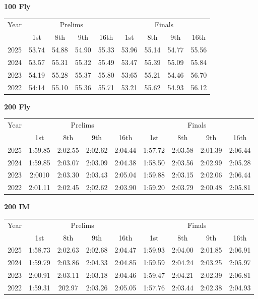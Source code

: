 \textbf{100 Fly}

\begin{flushleft}
\begin{tabular}{|c|c|c|c|c|c|c|c|c|}
\hline
Year & \multicolumn{4}{c|}{Prelims} & \multicolumn{4}{c|}{Finals} \\
\cline{2-9}
& 1st & 8th & 9th & 16th & 1st & 8th & 9th & 16th \\
\hline
2025 & 53.74 & 54.88 & 54.90 & 55.33 & 53.96 & 55.14 & 54.77 & 55.56 \\
2024 & 53.57 & 55.31 & 55.32 & 55.49 & 53.47 & 55.39 & 55.09 & 55.84 \\
2023 & 54.19 & 55.28 & 55.37 & 55.80 & 53:65 & 55.21 & 54.46 & 56.70 \\
2022 & 54:14 & 55.10 & 55.36 & 55.71 & 53.21 & 55.62 & 54.93 & 56.12 \\
\hline
\end{tabular}
\end{flushleft}

\textbf{200 Fly}

\begin{flushleft}
\begin{tabular}{|c|c|c|c|c|c|c|c|c|}
\hline
Year & \multicolumn{4}{c|}{Prelims} & \multicolumn{4}{c|}{Finals} \\
\cline{2-9}
& 1st & 8th & 9th & 16th & 1st & 8th & 9th & 16th \\
\hline
2025 & 1:59.85 & 2:02.55 & 2:02.62 & 2:04.44 & 1:57.72 & 2:03.58 & 2:01.39 & 2:06.44 \\
2024 & 1:59.85 & 2:03.07 & 2:03.09 & 2:04.38 & 1:58.50 & 2:03.56 & 2:02.99 & 2:05.28 \\
2023 & 2:0010 & 2:03.30 & 2:03.43 & 2:05.04 & 1:59.88 & 2:03.15 & 2:02.06 & 2:06.44 \\
2022 & 2:01.11 & 2:02.45 & 2;02.62 & 2:03.90 & 1:59.20 & 2:03.79 & 2:00.48 & 2:05.81 \\
\hline
\end{tabular}
\end{flushleft}

\textbf{200 IM}

\begin{flushleft}
\begin{tabular}{|c|c|c|c|c|c|c|c|c|}
\hline
Year & \multicolumn{4}{c|}{Prelims} & \multicolumn{4}{c|}{Finals} \\
\cline{2-9}
& 1st & 8th & 9th & 16th & 1st & 8th & 9th & 16th \\
\hline
2025 & 1:58.73 & 2:02.63 & 2:02.68 & 2:04.47 & 1:59.93 & 2:04.00 & 2:01.85 & 2:06.91 \\
2024 & 1:59.79 & 2:03.86 & 2:04.33 & 2:04.85 & 1:59.59 & 2:04.24 & 2:03.25 & 2:05.97 \\
2023 & 2:00.91 & 2:03.11 & 2:03.18 & 2:04.46 & 1:59.47 & 2:04.21 & 2:02.39 & 2:06.81 \\
2022 & 1:59.31 & 202.97 & 2:03.26 & 2:05.05 & 1:57.76 & 2:03.44 & 2:02.38 & 2:04.93 \\
\hline
\end{tabular}
\end{flushleft}

